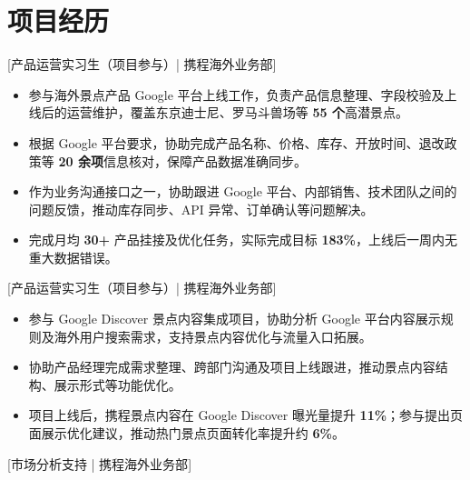 \documentclass{resume}
\begin{document}
\section{项目经历}

[\textnormal{产品运营实习生（项目参与）| 携程海外业务部}]

\begin{itemize}

\item 参与海外景点产品 Google 平台上线工作，负责产品信息整理、字段校验及上线后的运营维护，覆盖东京迪士尼、罗马斗兽场等 \textbf{55 个}高潜景点。

\item 根据 Google 平台要求，协助完成产品名称、价格、库存、开放时间、退改政策等 \textbf{20 余项}信息核对，保障产品数据准确同步。

\item 作为业务沟通接口之一，协助跟进 Google 平台、内部销售、技术团队之间的问题反馈，推动库存同步、API 异常、订单确认等问题解决。

\item 完成月均 \textbf{30+} 产品挂接及优化任务，实际完成目标 \textbf{183\%}，上线后一周内无重大数据错误。

\end{itemize}

[\textnormal{产品运营实习生（项目参与）| 携程海外业务部}]

\begin{itemize}

\item 参与 Google Discover 景点内容集成项目，协助分析 Google 平台内容展示规则及海外用户搜索需求，支持景点内容优化与流量入口拓展。

\item 协助产品经理完成需求整理、跨部门沟通及项目上线跟进，推动景点内容结构、展示形式等功能优化。

\item 项目上线后，携程景点内容在 Google Discover 曝光量提升 \textbf{11\%}；参与提出页面展示优化建议，推动热门景点页面转化率提升约 \textbf{6\%}。

\end{itemize}

[\textnormal{市场分析支持 | 携程海外业务部}]
\end{document}
